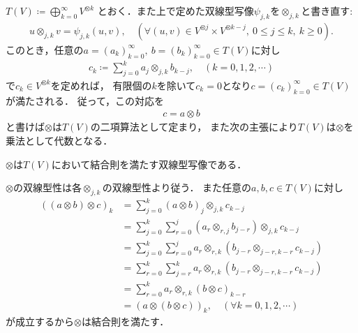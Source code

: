 	$T(V) \coloneqq \bigoplus_{k=0}^{\infty} V^{\otimes k}$
	とおく．また上で定めた双線型写像$\psi_{j,k}$を$\otimes_{j,k}$と書き直す:
	\begin{align}
		u \otimes_{j,k} v = \psi_{j,k}(u,v),
		\quad (\forall (u,v) \in V^{\otimes j} \times V^{\otimes k-j},\ 0 \leq j \leq k,\ k \geq 0).
		\label{eq:def_of_otimes_for_completion_V_tensor_k}
	\end{align}
	このとき，任意の$a=(a_k)_{k=0}^{\infty},\ b=(b_k)_{k=0}^{\infty} \in T(V)$に対し
	\begin{align}
		c_k \coloneqq \sum_{j=0}^{k} a_j \otimes_{j,k} b_{k-j},
		\quad (k=0,1,2,\cdots)
	\end{align}
	で$c_k \in V^{\otimes k}$を定めれば，
	有限個の$k$を除いて$c_k = 0$となり$c = (c_k)_{k=0}^{\infty} \in T(V)$が満たされる．
	従って，この対応を
	\begin{align}
		c = a \otimes b
	\end{align}
	と書けば$\otimes$は$T(V)$の二項算法として定まり，
	また次の主張により$T(V)$は$\otimes$を乗法として代数となる．
	\begin{screen}
		\begin{thm}
			$\otimes$は$T(V)$において結合則を満たす双線型写像である．
		\end{thm}
	\end{screen}
	
	\begin{prf}
		$\otimes$の双線型性は各$\otimes_{j,k}$の双線型性より従う．
		また任意の$a,b,c \in T(V)$に対し
		\begin{align}
			((a \otimes b) \otimes c)_k
			&= \sum_{j=0}^k (a \otimes b)_j \otimes_{j,k} c_{k-j} \\
			&= \sum_{j=0}^k \sum_{r=0}^j \left( a_r \otimes_{r,j} b_{j-r} \right) \otimes_{j,k} c_{k-j} \\
			&= \sum_{j=0}^k \sum_{r=0}^j a_r \otimes_{r,k} \left( b_{j-r} \otimes_{j-r,k-r} c_{k-j} \right) \\
			&= \sum_{r=0}^k \sum_{j=r}^k a_r \otimes_{r,k} \left( b_{j-r} \otimes_{j-r,k-r} c_{k-j} \right) \\
			&= \sum_{r=0}^k a_r \otimes_{r,k} (b \otimes c)_{k-r} \\
			&= (a \otimes (b \otimes c))_k,
			\quad (\forall k = 0,1,2,\cdots)
		\end{align}
		が成立するから$\otimes$は結合則を満たす．
		\QED
	\end{prf}
	
